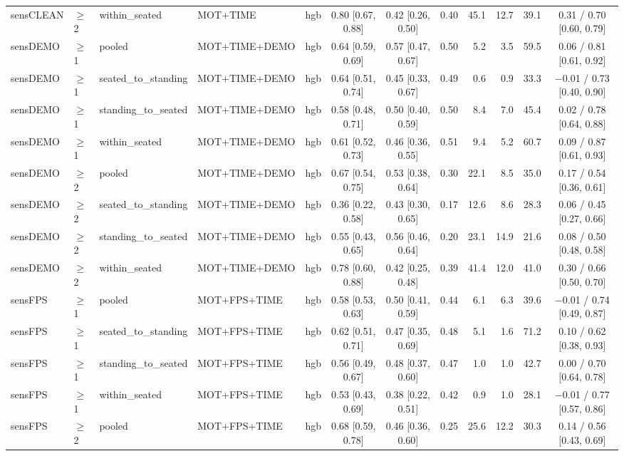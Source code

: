 \begin{longtable}{@{}lllllcccrrrc@{}}
sensCLEAN & $\geq$2 & within\_seated & MOT+TIME & hgb & 0.80 [0.67, 0.88] & 0.42 [0.26, 0.50] & 0.40 & 45.1 & 12.7 & 39.1 & 0.31 / 0.70 [0.60, 0.79] \\
sensDEMO & $\geq$1 & pooled & MOT+TIME+DEMO & hgb & 0.64 [0.59, 0.69] & 0.57 [0.47, 0.67] & 0.50 & 5.2 & 3.5 & 59.5 & 0.06 / 0.81 [0.61, 0.92] \\
sensDEMO & $\geq$1 & seated\_to\_standing & MOT+TIME+DEMO & hgb & 0.64 [0.51, 0.74] & 0.45 [0.33, 0.67] & 0.49 & 0.6 & 0.9 & 33.3 & $-$0.01 / 0.73 [0.40, 0.90] \\
sensDEMO & $\geq$1 & standing\_to\_seated & MOT+TIME+DEMO & hgb & 0.58 [0.48, 0.71] & 0.50 [0.40, 0.59] & 0.50 & 8.4 & 7.0 & 45.4 & 0.02 / 0.78 [0.64, 0.88] \\
sensDEMO & $\geq$1 & within\_seated & MOT+TIME+DEMO & hgb & 0.61 [0.52, 0.73] & 0.46 [0.36, 0.55] & 0.51 & 9.4 & 5.2 & 60.7 & 0.09 / 0.87 [0.61, 0.93] \\
sensDEMO & $\geq$2 & pooled & MOT+TIME+DEMO & hgb & 0.67 [0.54, 0.75] & 0.53 [0.38, 0.64] & 0.30 & 22.1 & 8.5 & 35.0 & 0.17 / 0.54 [0.36, 0.61] \\
sensDEMO & $\geq$2 & seated\_to\_standing & MOT+TIME+DEMO & hgb & 0.36 [0.22, 0.58] & 0.43 [0.30, 0.65] & 0.17 & 12.6 & 8.6 & 28.3 & 0.06 / 0.45 [0.27, 0.66] \\
sensDEMO & $\geq$2 & standing\_to\_seated & MOT+TIME+DEMO & hgb & 0.55 [0.43, 0.65] & 0.56 [0.46, 0.64] & 0.20 & 23.1 & 14.9 & 21.6 & 0.08 / 0.50 [0.48, 0.58] \\
sensDEMO & $\geq$2 & within\_seated & MOT+TIME+DEMO & hgb & 0.78 [0.60, 0.88] & 0.42 [0.25, 0.48] & 0.39 & 41.4 & 12.0 & 41.0 & 0.30 / 0.66 [0.50, 0.70] \\
sensFPS & $\geq$1 & pooled & MOT+FPS+TIME & hgb & 0.58 [0.53, 0.63] & 0.50 [0.41, 0.59] & 0.44 & 6.1 & 6.3 & 39.6 & $-$0.01 / 0.74 [0.49, 0.87] \\
sensFPS & $\geq$1 & seated\_to\_standing & MOT+FPS+TIME & hgb & 0.62 [0.51, 0.71] & 0.47 [0.35, 0.69] & 0.48 & 5.1 & 1.6 & 71.2 & 0.10 / 0.62 [0.38, 0.93] \\
sensFPS & $\geq$1 & standing\_to\_seated & MOT+FPS+TIME & hgb & 0.56 [0.49, 0.67] & 0.48 [0.37, 0.60] & 0.47 & 1.0 & 1.0 & 42.7 & 0.00 / 0.70 [0.64, 0.78] \\
sensFPS & $\geq$1 & within\_seated & MOT+FPS+TIME & hgb & 0.53 [0.43, 0.69] & 0.38 [0.22, 0.51] & 0.42 & 0.9 & 1.0 & 28.1 & $-$0.01 / 0.77 [0.57, 0.86] \\
sensFPS & $\geq$2 & pooled & MOT+FPS+TIME & hgb & 0.68 [0.59, 0.78] & 0.46 [0.36, 0.60] & 0.25 & 25.6 & 12.2 & 30.3 & 0.14 / 0.56 [0.43, 0.69] \\

\end{longtable}
